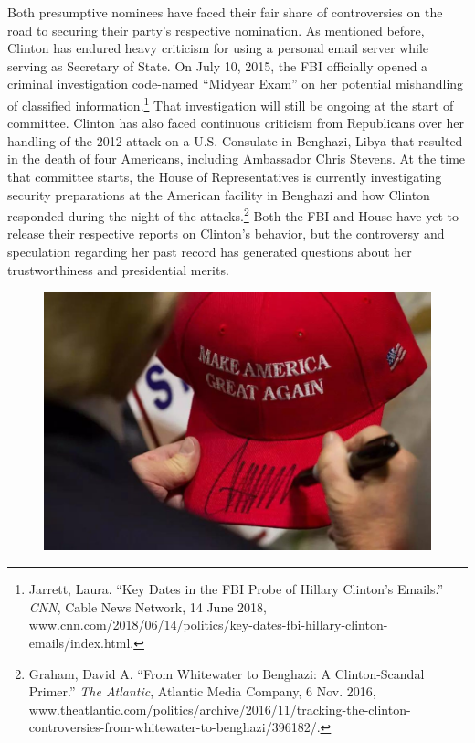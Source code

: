 \documentclass[10pt, letterpaper]{article}
\begin{document}
Both presumptive nominees have faced their fair share of controversies
on the road to securing their party's respective nomination. As
mentioned before, Clinton has endured heavy criticism for using a
personal email server while serving as Secretary of State. On July 10,
2015, the FBI officially opened a criminal investigation code-named
``Midyear Exam'' on her potential mishandling of classified
information.\footnote{Jarrett, Laura. ``Key Dates in the FBI Probe of
  Hillary Clinton's Emails.'' \emph{CNN}, Cable News Network, 14 June
  2018,
  www.cnn.com/2018/06/14/politics/key-dates-fbi-hillary-clinton-emails/index.html.}
That investigation will still be ongoing at the start of committee.
Clinton has also faced continuous criticism from Republicans over her
handling of the 2012 attack on a U.S. Consulate in Benghazi, Libya that
resulted in the death of four Americans, including Ambassador Chris
Stevens. At the time that committee starts, the House of Representatives
is currently investigating security preparations at the American
facility in Benghazi and how Clinton responded during the night of the
attacks.\footnote{Graham, David A. ``From Whitewater to Benghazi: A
  Clinton-Scandal Primer.'' \emph{The Atlantic}, Atlantic Media Company,
  6 Nov. 2016,
  www.theatlantic.com/politics/archive/2016/11/tracking-the-clinton-controversies-from-whitewater-to-benghazi/396182/.}
Both the FBI and House have yet to release their respective reports on
Clinton's behavior, but the controversy and speculation regarding her
past record has generated questions about her trustworthiness and
presidential merits. \\

 \begin{figure}
 \centering
 \includegraphics[scale = 0.15]{image5.jpg} 
 \end{figure}
 
\end{document}
